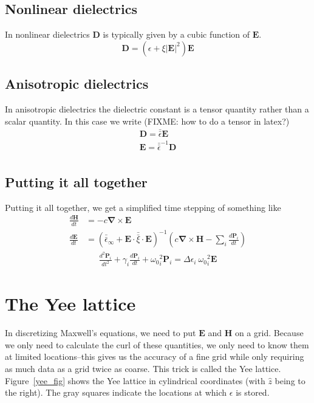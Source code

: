 \documentclass[floats]{book}
\begin{document}
\subsection{Nonlinear dielectrics}

In nonlinear dielectrics $\mathbf D$ is typically given by a cubic function
of $\mathbf E$.
\begin{equation}
  \mathbf D = \left(\epsilon + \xi \left|\mathbf E\right|^2 \right)\mathbf E
\end{equation}

\subsection{Anisotropic dielectrics}
In anisotropic dielectrics the dielectric constant is a tensor quantity
rather than a scalar quantity.  In this case we write (FIXME: how to do a
tensor in latex?)
\begin{align}
  \mathbf D = \bar{\bar \epsilon} \mathbf E\\
  \mathbf E = \bar{\bar \epsilon}^{-1} \mathbf D\\
\end{align}

\subsection{Putting it all together}

Putting it all together, we get a simplified time stepping of something
like
\begin{align}
\frac{d\mathbf H}{dt} &= -c \mathbf \nabla \times \mathbf E\\
\frac{d\mathbf E}{dt} &= \left( \bar{\bar{\epsilon}}_\infty +
                                \mathbf E \cdot \bar{\bar \xi} \cdot \mathbf E
                         \right)^{-1}
  \left(
  c \mathbf \nabla \times \mathbf H
  - \sum_i \frac{d\mathbf P_i}{dt}
  \right)
\end{align}
\begin{align}
\frac{d^2\mathbf{P}_i}{dt^2} + \gamma_i \frac{d\mathbf{P}_i}{dt}
+ {\omega_0}_i^2 \mathbf{P}_i = \Delta\epsilon_i\ {\omega_0}_i^2 \mathbf{E}
\end{align}

\section{The Yee lattice}

In discretizing Maxwell's equations, we need to put $\mathbf E$ and
$\mathbf H$ on a grid.  Because we only need to calculate the curl of these
quantities, we only need to know them at limited locations--this gives us
the accuracy of a fine grid while only requiring as much data as a grid
twice as coarse.  This trick is called the Yee lattice.
Figure~\ref{yee_fig} shows the Yee lattice in cylindrical coordinates (with
$\hat z$ being to the right).  The gray squares indicate the locations at
which $\epsilon$ is stored.
\end{document}
